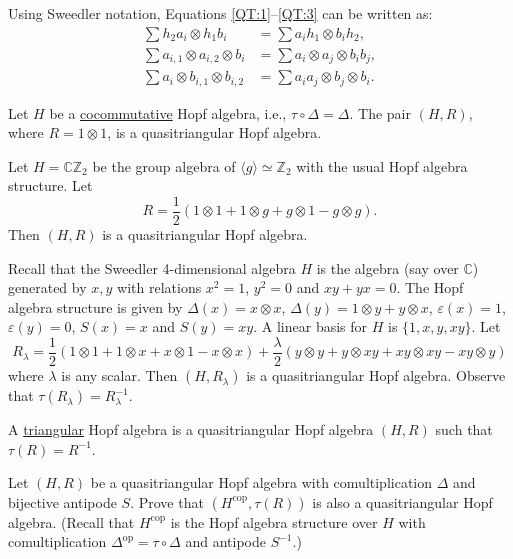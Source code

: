 \begin{remark}
Using Sweedler notation, Equations \eqref{QT:1}--\eqref{QT:3} can
be written as:
\begin{align*}
\sum h_{2}a_{i}\otimes h_{1}b_{i} & =\sum a_{i}h_{1}\otimes b_{i}h_{2},\\
\sum a_{i,1}\otimes a_{i,2}\otimes b_{i} & =\sum a_{i}\otimes a_{j}\otimes b_{i}b_{j},\\
\sum a_{i}\otimes b_{i,1}\otimes b_{i,2} & =\sum a_{i}a_{j}\otimes b_{j}\otimes b_{i}.
\end{align*}
\end{remark}

\begin{example}
Let $H$ be a \underline{cocommutative} Hopf algebra, i.e.,
$\tau\circ\Delta=\Delta$.  The pair $(H,R)$, where $R=1\otimes1$, is a
quasitriangular Hopf algebra.
\end{example}

\begin{example}
Let $H=\mathbb{C}\mathbb{Z}_{2}$ be the group algebra of $\langle
g\rangle\simeq\mathbb{Z}_{2}$ with the usual Hopf algebra structure. Let 
\[
R=\frac{1}{2}(1\otimes1+1\otimes g+g\otimes1-g\otimes g).
\]
Then $(H,R)$ is a quasitriangular Hopf algebra.
\end{example}

\begin{example}
Recall that the Sweedler 4-dimensional algebra $H$ is the algebra (say over
$\mathbb{C}$) generated by $x,y$ with relations $x^{2}=1$, $y^{2}=0$ and
$xy+yx=0$.  The Hopf algebra structure is given by $\Delta(x)=x\otimes x$,
$\Delta(y)=1\otimes y+y\otimes x$, $\varepsilon(x)=1$, $\varepsilon(y)=0$,
$S(x)=x$ and $S(y)=xy$.  A linear basis for $H$ is $\{1,x,y,xy\}$. Let
\[
R_{\lambda}=\frac{1}{2}(1\otimes1+1\otimes x+x\otimes1-x\otimes x)+\frac{\lambda}{2}(y\otimes y+y\otimes xy+xy\otimes xy-xy\otimes y)
\]
where $\lambda$ is any scalar. Then $(H,R_{\lambda})$ is a quasitriangular
Hopf algebra. Observe that $\tau(R_{\lambda})=R_{\lambda}^{-1}$.
\end{example}

\begin{definition}
A \underline{triangular} Hopf algebra is a quasitriangular Hopf algebra
$(H,R)$ such that $\tau(R)=R^{-1}$. 
\end{definition}

\begin{exercise}
Let $(H,R)$ be a quasitriangular Hopf algebra with comultiplication $\Delta$
and bijective antipode $S$. Prove that $(H^{\mathrm{cop}},\tau(R))$ is also a
quasitriangular Hopf algebra. (Recall that $H^{\mathrm{cop}}$ is the Hopf
algebra structure over $H$ with comultiplication
$\Delta^{\mathrm{op}}=\tau\circ\Delta$ and antipode $S^{-1}$.)
\end{exercise}

